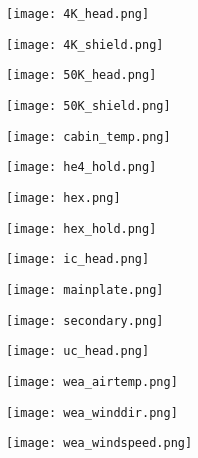 \documentclass{article}
\begin{document}
\begin{figure}
    \centering
    \texttt{[image: 4K\_head.png]}
\end{figure}
\begin{figure}
    \centering
    \texttt{[image: 4K\_shield.png]}
\end{figure}
\clearpage
\begin{figure}
    \centering
    \texttt{[image: 50K\_head.png]}
\end{figure}
\begin{figure}
    \centering
    \texttt{[image: 50K\_shield.png]}
\end{figure}
\clearpage
\begin{figure}
    \centering
    \texttt{[image: cabin\_temp.png]}
\end{figure}
\begin{figure}
    \centering
    \texttt{[image: he4\_hold.png]}
\end{figure}
\clearpage
\begin{figure}
    \centering
    \texttt{[image: hex.png]}
\end{figure}
\begin{figure}
    \centering
    \texttt{[image: hex\_hold.png]}
\end{figure}
\clearpage
\begin{figure}
    \centering
    \texttt{[image: ic\_head.png]}
\end{figure}
\begin{figure}
    \centering
    \texttt{[image: mainplate.png]}
\end{figure}
\clearpage
\begin{figure}
    \centering
    \texttt{[image: secondary.png]}
\end{figure}
\begin{figure}
    \centering
    \texttt{[image: uc\_head.png]}
\end{figure}
\clearpage
\begin{figure}
    \centering
    \texttt{[image: wea\_airtemp.png]}
\end{figure}
\begin{figure}
    \centering
    \texttt{[image: wea\_winddir.png]}
\end{figure}
\clearpage
\begin{figure}
    \centering
    \texttt{[image: wea\_windspeed.png]}
\end{figure}
\end{document}
